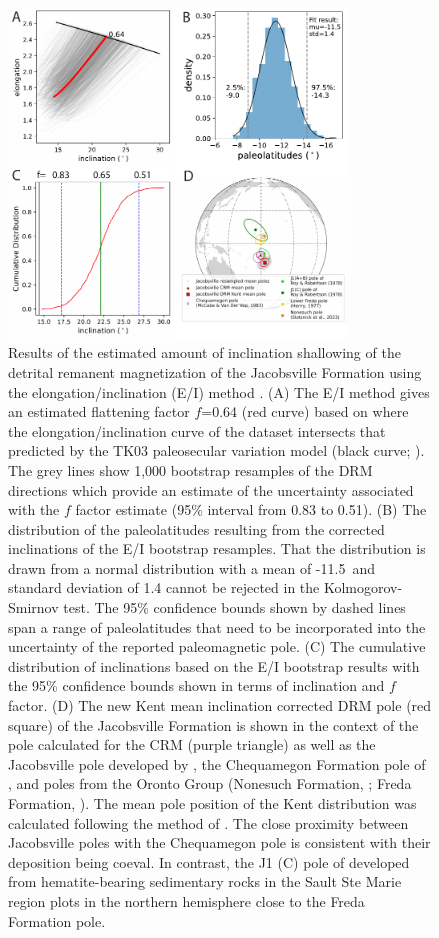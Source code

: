 \begin{figure}[h!]
\centering
\includegraphics[width=0.8\textwidth]{figure/Zhang2024a/EI_results.pdf}
\caption{\scriptsize Results of the estimated amount of inclination shallowing of the detrital remanent magnetization of the Jacobsville Formation using the elongation/inclination (E/I) method \citep{Tauxe2004b}. (A) The E/I method gives an estimated flattening factor $f$=0.64 (red curve) based on where the elongation/inclination curve of the dataset intersects that predicted by the TK03 paleosecular variation model (black curve; \cite{Tauxe2004b}). The grey lines show 1,000 bootstrap resamples of the DRM directions which provide an estimate of the uncertainty associated with the $f$ factor estimate (95\% interval from 0.83 to 0.51). (B) The distribution of the paleolatitudes resulting from the corrected inclinations of the E/I bootstrap resamples. That the distribution is drawn from a normal distribution with a mean of -11.5\textdegree\ and standard deviation of 1.4 cannot be rejected in the Kolmogorov-Smirnov test. The 95\% confidence bounds shown by dashed lines span a range of paleolatitudes that need to be incorporated into the uncertainty of the reported paleomagnetic pole. (C) The cumulative distribution of inclinations based on the E/I bootstrap results with the 95\% confidence bounds shown in terms of inclination and $f$ factor. (D) The new Kent mean inclination corrected DRM pole (red square) of the Jacobsville Formation is shown in the context of the pole calculated for the CRM (purple triangle) as well as the Jacobsville pole developed by \cite{Roy1978a}, the Chequamegon Formation pole of \cite{McCabe1983a}, and poles from the Oronto Group (Nonesuch Formation, \cite{Slotznick2023a}; Freda Formation, \cite{Henry1977a}). The mean pole position of the Kent distribution was calculated following the method of \cite{Pierce2022a}. The close proximity between Jacobsville poles with the Chequamegon pole is consistent with their deposition being coeval. In contrast, the J1 (C) pole of \cite{Roy1978a} developed from hematite-bearing sedimentary rocks in the Sault Ste Marie region plots in the northern hemisphere close to the Freda Formation pole. }
\label{fig:EI_results}
\end{figure}


